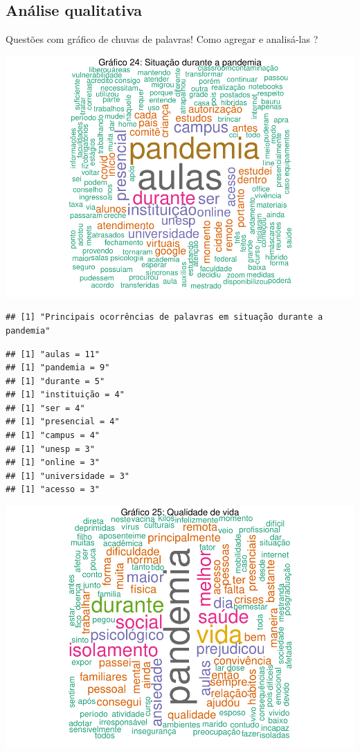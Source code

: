 \documentclass[
]{article}
\begin{document}
\hypertarget{anuxe1lise-qualitativa}{%
\subsection{Análise qualitativa}\label{anuxe1lise-qualitativa}}

Questões com gráfico de chuvas de palavras! Como agregar e analisá-las ?

\includegraphics{consequencias-oriundas-da-pandemia-v1.0_files/figure-latex/grafico-24-1.pdf}

\begin{verbatim}
## [1] "Principais ocorrências de palavras em situação durante a pandemia"
\end{verbatim}

\begin{verbatim}
## [1] "aulas = 11"
## [1] "pandemia = 9"
## [1] "durante = 5"
## [1] "instituição = 4"
## [1] "ser = 4"
## [1] "presencial = 4"
## [1] "campus = 4"
## [1] "unesp = 3"
## [1] "online = 3"
## [1] "universidade = 3"
## [1] "acesso = 3"
\end{verbatim}

\includegraphics{consequencias-oriundas-da-pandemia-v1.0_files/figure-latex/grafico-25-1.pdf}
\end{document}
